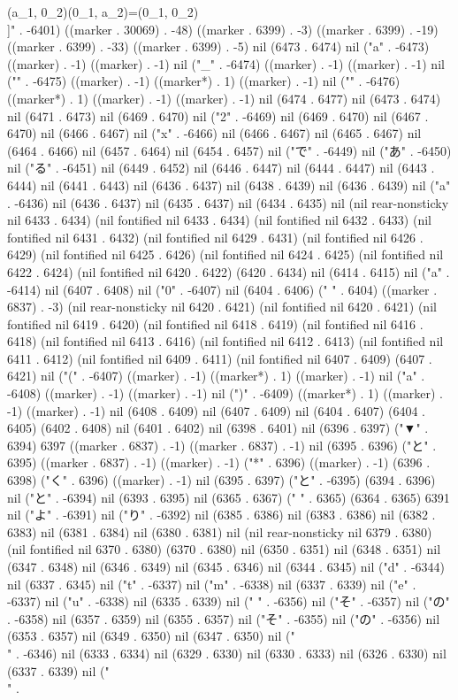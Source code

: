   (a_{1}, 0_{2})(0_{1}, a_{2})=(0_{1}, 0_{2})
  \\]" . -6401) ((marker . 30069) . -48) ((marker . 6399) . -3) ((marker . 6399) . -19) ((marker . 6399) . -33) ((marker . 6399) . -5) nil (6473 . 6474) nil ("a" . -6473) ((marker) . -1) ((marker) . -1) nil ("_" . -6474) ((marker) . -1) ((marker) . -1) nil ("{" . -6475) ((marker) . -1) ((marker*) . 1) ((marker) . -1) nil ("}" . -6476) ((marker*) . 1) ((marker) . -1) ((marker) . -1) nil (6474 . 6477) nil (6473 . 6474) nil (6471 . 6473) nil (6469 . 6470) nil ("2" . -6469) nil (6469 . 6470) nil (6467 . 6470) nil (6466 . 6467) nil ("x" . -6466) nil (6466 . 6467) nil (6465 . 6467) nil (6464 . 6466) nil (6457 . 6464) nil (6454 . 6457) nil ("で" . -6449) nil ("あ" . -6450) nil ("る" . -6451) nil (6449 . 6452) nil (6446 . 6447) nil (6444 . 6447) nil (6443 . 6444) nil (6441 . 6443) nil (6436 . 6437) nil (6438 . 6439) nil (6436 . 6439) nil ("a" . -6436) nil (6436 . 6437) nil (6435 . 6437) nil (6434 . 6435) nil (nil rear-nonsticky nil 6433 . 6434) (nil fontified nil 6433 . 6434) (nil fontified nil 6432 . 6433) (nil fontified nil 6431 . 6432) (nil fontified nil 6429 . 6431) (nil fontified nil 6426 . 6429) (nil fontified nil 6425 . 6426) (nil fontified nil 6424 . 6425) (nil fontified nil 6422 . 6424) (nil fontified nil 6420 . 6422) (6420 . 6434) nil (6414 . 6415) nil ("a" . -6414) nil (6407 . 6408) nil ("0" . -6407) nil (6404 . 6406) ("   " . 6404) ((marker . 6837) . -3) (nil rear-nonsticky nil 6420 . 6421) (nil fontified nil 6420 . 6421) (nil fontified nil 6419 . 6420) (nil fontified nil 6418 . 6419) (nil fontified nil 6416 . 6418) (nil fontified nil 6413 . 6416) (nil fontified nil 6412 . 6413) (nil fontified nil 6411 . 6412) (nil fontified nil 6409 . 6411) (nil fontified nil 6407 . 6409) (6407 . 6421) nil ("(" . -6407) ((marker) . -1) ((marker*) . 1) ((marker) . -1) nil ("a" . -6408) ((marker) . -1) ((marker) . -1) nil (")" . -6409) ((marker*) . 1) ((marker) . -1) ((marker) . -1) nil (6408 . 6409) nil (6407 . 6409) nil (6404 . 6407) (6404 . 6405) (6402 . 6408) nil (6401 . 6402) nil (6398 . 6401) nil (6396 . 6397) ("▼" . 6394) 6397 ((marker . 6837) . -1) ((marker . 6837) . -1) nil (6395 . 6396) ("と" . 6395) ((marker . 6837) . -1) ((marker) . -1) ("*" . 6396) ((marker) . -1) (6396 . 6398) ("く" . 6396) ((marker) . -1) nil (6395 . 6397) ("と" . -6395) (6394 . 6396) nil ("と" . -6394) nil (6393 . 6395) nil (6365 . 6367) (" " . 6365) (6364 . 6365) 6391 nil ("よ" . -6391) nil ("り" . -6392) nil (6385 . 6386) nil (6383 . 6386) nil (6382 . 6383) nil (6381 . 6384) nil (6380 . 6381) nil (nil rear-nonsticky nil 6379 . 6380) (nil fontified nil 6370 . 6380) (6370 . 6380) nil (6350 . 6351) nil (6348 . 6351) nil (6347 . 6348) nil (6346 . 6349) nil (6345 . 6346) nil (6344 . 6345) nil ("d" . -6344) nil (6337 . 6345) nil ("t" . -6337) nil ("m" . -6338) nil (6337 . 6339) nil ("e" . -6337) nil ("u" . -6338) nil (6335 . 6339) nil (" " . -6356) nil ("そ" . -6357) nil ("の" . -6358) nil (6357 . 6359) nil (6355 . 6357) nil ("そ" . -6355) nil ("の" . -6356) nil (6353 . 6357) nil (6349 . 6350) nil (6347 . 6350) nil ("\\" . -6346) nil (6333 . 6334) nil (6329 . 6330) nil (6330 . 6333) nil (6326 . 6330) nil (6337 . 6339) nil ("\\" . 